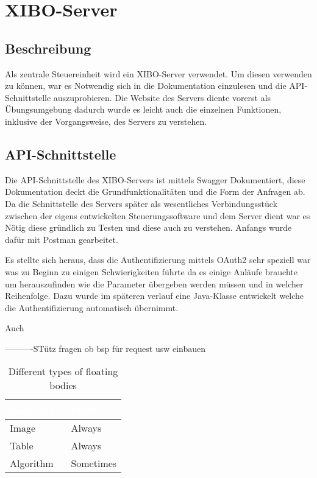 \chapter{XIBO-Server}
\section{Beschreibung}
Als zentrale Steuereinheit wird ein XIBO-Server verwendet. Um diesen verwenden zu können, war es Notwendig sich in die Dokumentation einzulesen und die API-Schnittstelle auszuprobieren. Die Website des Servers diente vorerst als Übungsumgebung dadurch wurde es leicht auch die einzelnen Funktionen, inklusive der Vorgangsweise, des Servers zu verstehen.

\section{API-Schnittstelle}
Die API-Schnittstelle des XIBO-Servers ist mittels Swagger Dokumentiert, diese Dokumentation deckt die Grundfunktionalitäten und die Form der Anfragen ab. Da die Schnittstelle des Servers später als wesentliches Verbindungsstück zwischen der eigens entwickelten Steuerungssoftware und dem Server dient war es Nötig diese gründlich zu Testen und diese auch zu verstehen. Anfangs wurde dafür mit Postman gearbeitet. 

Es stellte sich heraus, dass die Authentifizierung mittels OAuth2 sehr speziell war was zu Beginn zu einigen Schwierigkeiten führte da es einige Anläufe brauchte um herauszufinden wie die Parameter übergeben werden müssen und in welcher Reihenfolge. Dazu wurde im späteren verlauf eine Java-Klasse entwickelt welche die Authentifizierung automatisch übernimmt.

Auch 

----------STütz fragen ob bsp für request usw einbauen




\begin{table}
	\begin{center}
	\begin{tabular}{|l|l|}
		\hline
		\cellcolor{Gray}\textcolor{White}{Body type} & \cellcolor{Gray}\textcolor{White}{Floats} \\
		\hline
		Image & Always \\
		\hline
		Table & Always \\
		\hline
		Algorithm & Sometimes \\
		\hline
	\end{tabular}
	\end{center}
	\caption{Different types of floating bodies}
	\label{tab:types-of-floating-bodies}
\end{table}